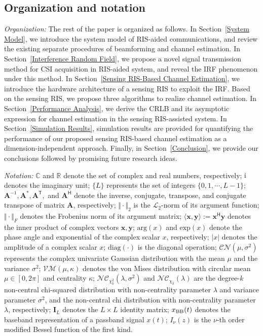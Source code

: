 \documentclass[journal,twocolumn]{IEEEtran}
\theoremstyle{nonumberplain}
\def \T {\bm \Theta}
\def \VM {\mathcal{VM}}
\def \nc {\mathcal{NC}}
\def \T {^{\mathsf{T}}}
\def \H {^{\mathsf{H}}}
\def \ri {{\rm i}}
\begin{document}
\subsection{Organization and notation}

\textit{Organization:}
The rest of the paper is organized as follows.
In Section~\ref{System Model}, we introduce the system model of RIS-aided communications, and review the existing separate procedures of beamforming and channel estimation.
In Section~\ref{Interference Random Field}, we propose a novel signal transmission method for CSI acquisition in RIS-aided system, and reveal the \ac{IRF} phenomenon under this method.
In Section~\ref{Sensing RIS-Based Channel Estimation}, we introduce the hardware architecture of a sensing RIS to exploit the \ac{IRF}.
Based on the sensing RIS, we propose three algorithms to realize channel estimation.
In Section~\ref{Performance Analysis}, we derive the \ac{CRLB} and its asymptotic expression for channel estimation in the sensing RIS-assisted system.
In Section~\ref{Simulation Results}, simulation results are provided for quantifying the performance of our proposed sensing RIS-based channel estimation as a dimension-independent approach.
Finally, in Section~\ref{Conclusion}, we provide our conclusions followed by promising future research ideas.

\textit{Notation:} $\mathbb C$ and $\mathbb R$ denote the set of complex and real numbers, respectively;
$\ri$ denotes the imaginary unit; 
$\{L\}$ represents the set of integers $\{0,1,\cdots,L-1\}$;
$\bm A^{-1}, \bm A^*,\bm A\T,$ and $\bm A\H$ denote the inverse, conjugate, transpose, and conjugate transpose of matrix $\bm A$, respectively; 
$\Vert \cdot\Vert_{2}$ is the $\mathcal{L}_{2}$-norm of its argument function;
$\Vert \cdot \Vert_{F}$ denotes the Frobenius norm of its argument matrix;  
$\langle{\bm x}, {\bm y}\rangle := {\bm x}\H {\bm y}$ denotes the inner product of complex vectors ${\bm x}, {\bm y}$; 
$\text{arg}(x)$ and $\text{exp}(x)$ denote the phase angle and exponential of the complex scalar $x$, respectively;
$\vert x\vert$ denotes the amplitude
of a complex scalar $x$; 
$\text{diag}(\cdot )$ is the diagonal operation;
$\mathcal{CN}\left(\mu, \sigma^2 \right)$ represents the complex univariate Gaussian distribution with the mean $\mu$ and the variance $\sigma^2$;
$\VM(\mu, \kappa)$ denotes the von Mises distribution with circular mean $\mu\in [0,2\pi]$ and centrality $\kappa$;
$\nc_{\chi_k^2}(\lambda, \sigma^2)$ and $\nc_{\chi_k}(\lambda)$ are the degree-$k$ non-central chi-squared distribution with  non-centrality parameter $\lambda$ and variance parameter $\sigma^2$, and the non-central chi distribution with non-centrality parameter $\lambda$, respectively; 
$\bm I_{L}$ denotes the $L\times L$ identity matrix;
$x_{\rm BB}(t)$ denotes the baseband representation of a passband signal $x(t)$;
$I_\nu(z)$ is the $\nu$-th order modified Bessel function of the first kind. 
\end{document}
